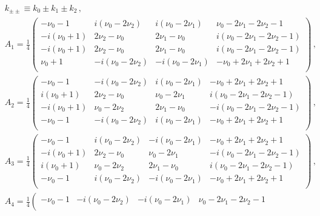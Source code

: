 \documentclass[a4paper,11pt]{article}
\newcommand{\nn}{\nonumber}
\begin{document}
\begin{align}
&k_{\pm\pm}\equiv k_0\pm k_1\pm k_2 \, , \\
&A_1=\frac{1}{4}\left(
\begin{array}{cccc}
 -\nu _0-1 & i \left(\nu _0-2 \nu _2\right) & i \left(\nu _0-2 \nu _1\right) & \nu _0-2 \nu _1-2 \nu _2-1 \\
 -i \left(\nu _0+1\right) & 2 \nu _2-\nu _0 & 2 \nu _1-\nu _0 & i \left(\nu _0-2 \nu _1-2 \nu _2-1\right) \\
 -i \left(\nu _0+1\right) & 2 \nu _2-\nu _0 & 2 \nu _1-\nu _0 & i \left(\nu _0-2 \nu _1-2 \nu _2-1\right) \\
 \nu _0+1 & -i \left(\nu _0-2 \nu _2\right) & -i \left(\nu _0-2 \nu _1\right) & -\nu _0+2 \nu _1+2 \nu _2+1 \\
\end{array}
\right) \,,\nn\\
&A_2=\frac{1}{4}\left(
\begin{array}{cccc}
 -\nu _0-1 & -i \left(\nu _0-2 \nu _2\right) & i \left(\nu _0-2 \nu _1\right) & -\nu _0+2 \nu _1+2 \nu _2+1 \\
 i \left(\nu _0+1\right) & 2 \nu _2-\nu _0 & \nu _0-2 \nu _1 & i \left(\nu _0-2 \nu _1-2 \nu _2-1\right) \\
 -i \left(\nu _0+1\right) & \nu _0-2 \nu _2 & 2 \nu _1-\nu _0 & -i \left(\nu _0-2 \nu _1-2 \nu _2-1\right) \\
 -\nu _0-1 & -i \left(\nu _0-2 \nu _2\right) & i \left(\nu _0-2 \nu _1\right) & -\nu _0+2 \nu _1+2 \nu _2+1 \\
\end{array}
\right) \,,\nn\\
&A_3=\frac{1}{4}\left(
\begin{array}{cccc}
 -\nu _0-1 & i \left(\nu _0-2 \nu _2\right) & -i \left(\nu _0-2 \nu _1\right) & -\nu _0+2 \nu _1+2 \nu _2+1 \\
 -i \left(\nu _0+1\right) & 2 \nu _2-\nu _0 & \nu _0-2 \nu _1 & -i \left(\nu _0-2 \nu _1-2 \nu _2-1\right) \\
 i \left(\nu _0+1\right) & \nu _0-2 \nu _2 & 2 \nu _1-\nu _0 & i \left(\nu _0-2 \nu _1-2 \nu _2-1\right) \\
 -\nu _0-1 & i \left(\nu _0-2 \nu _2\right) & -i \left(\nu _0-2 \nu _1\right) & -\nu _0+2 \nu _1+2 \nu _2+1 \\
\end{array}
\right) \,,\nn\\
&A_4=\frac{1}{4}\left(
\begin{array}{cccc}
 -\nu _0-1 & -i \left(\nu _0-2 \nu _2\right) & -i \left(\nu _0-2 \nu _1\right) & \nu _0-2 \nu _1-2 \nu _2-1 \\

\end{array}
\end{align}
\end{document}
